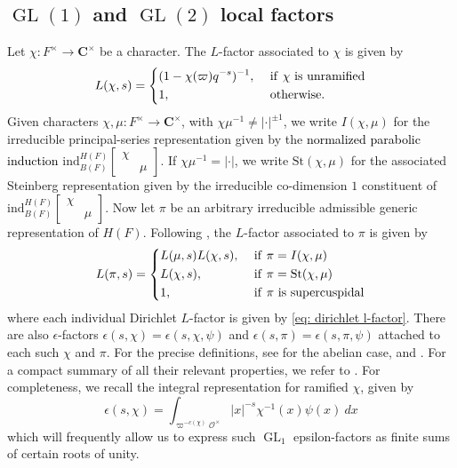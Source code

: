 \documentclass{amsart}
\theoremstyle{plain}
\theoremstyle{plain}
\theoremstyle{remark}
\DeclareMathOperator{\GL}{GL}
\begin{document}
\subsection{$\GL(1)$ and $\GL(2)$ local factors}
Let $\chi:F^\times\rightarrow \mathbf{C}^\times$ be a character. The $L$-factor associated to $\chi$ is given by 
\begin{align}\label{eq: dirichlet l-factor}L(\chi,s)=\begin{dcases}
    (1-\chi(\varpi)q^{-s})^{-1},& \ \mathrm{if}\ \chi\ \mathrm{is}\ \mathrm{unramified}\\
    1,& \ \mathrm{otherwise}. 
\end{dcases}\end{align}
Given characters $\chi,\mu:F^\times\rightarrow \mathbf{C}^\times$, with $\chi\mu^{-1}\neq |\cdot|^{\pm 1}$, we write $I(\chi,\mu)$ for the irreducible principal-series representation given by the \textcolor{black}{normalized parabolic induction} $\mathrm{ind}_{B(F)}^{H(F)}\left[\begin{smallmatrix}
    \chi & \\
     & \mu
\end{smallmatrix}\right]$. If $\chi\mu^{-1}=|\cdot|$, we write $\mathrm{St}(\chi,\mu)$ for the associated Steinberg representation given by the irreducible co-dimension $1$ constituent of $\mathrm{ind}_{B(F)}^{H(F)}\left[\begin{smallmatrix}
    \chi & \\
     & \mu
\end{smallmatrix}\right]$. Now let $\pi$ be an arbitrary irreducible admissible generic representation of $H(F)$. Following \cite{automorphic_on_GL}, the $L$-factor associated to $\pi$ is given by 
\begin{align}\label{eq: gl2 l-factor}
    L(\pi,s)=\begin{dcases}
        L(\mu,s)L(\chi,s),&\ \mathrm{if}\ \pi=I(\chi,\mu)\\
        L(\chi,s), &\ \mathrm{if}\ \pi=\mathrm{St}(\chi,\mu)\\
        1,&\ \mathrm{if}\ \pi\ \mathrm{is}\ \mathrm{supercuspidal}
    \end{dcases}
\end{align}
where each individual Dirichlet $L$-factor is given by \eqref{eq: dirichlet l-factor}. There are also $\epsilon$-factors $\epsilon(s,\chi)=\epsilon(s,\chi,\psi)$ and $\epsilon(s,\pi)=\epsilon(s,\pi,\psi)$ attached to each such $\chi$ and $\pi$. For the precise definitions, see \cite{tate1967fourier} for the abelian case, and \cite{automorphic_on_GL}. For a compact summary of all their relevant properties, we refer to \cite{schmidt2002some}. For completeness, we recall the integral representation for ramified $\chi$, given by $$\epsilon(s,\chi)=\int_{\varpi^{-c(\chi)}\mathcal{O}^\times}|x|^{-s}\chi^{-1}(x)\psi(x)\ dx$$
which will frequently allow us to express such $\GL_1$ epsilon-factors as finite sums of certain roots of unity.
\end{document}
